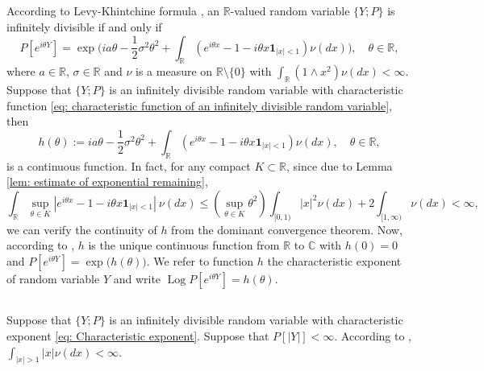 \documentclass[12pt, a4paper]{amsart}
\theoremstyle{definition}
\numberwithin{equation}{section}
\begin{document}
\subsection{}
\label{sec: definition of characteristic exponent}
	According to Levy-Khintchine formula \cite[Theorem 8.1]{Sato1990Levy}, an $\mathbb R$-valued random variable $\{Y; P\}$ is infinitely divisible if and only if
\begin{equation}
\label{eq: characteristic function of an infinitely divisible random variable}
	P[e^{i\theta Y}] 
	= \exp\Big( ia \theta - \frac{1}{2}\sigma^2 \theta^2 + \int_{\mathbb R}(e^{i\theta x} - 1 - i \theta x\mathbf 1_{|x|< 1}) \nu(dx)\Big),
    \quad \theta \in \mathbb R,
\end{equation}
	where $a\in \mathbb R$, $\sigma \in \mathbb R$ and $\nu$ is a measure on $\mathbb R\setminus\{0\}$ with $\int_{\mathbb R}(1\wedge x^2) \nu(dx)< \infty$.
	Suppose that $\{Y;P\}$ is an infinitely divisible random variable with characteristic function \eqref{eq: characteristic function of an infinitely divisible random variable}, then
\begin{equation}
\label{eq: Characteristic exponent}
	h(\theta) 
	:= ia \theta - \frac{1}{2}\sigma^2 \theta^2 + \int_{\mathbb R}(e^{i\theta x} - 1 - i \theta x\mathbf 1_{|x|< 1}) \nu(dx),
	\quad \theta \in \mathbb R, 
\end{equation}
    is a continuous function.
    In fact, for any compact $K \subset \mathbb R$, since due to Lemma \ref{lem: estimate of exponential remaining},
\begin{equation}
\int_{\mathbb R}\sup_{\theta \in K} |e^{i\theta x} - 1 - i \theta x\mathbf 1_{|x|< 1}|~\nu(dx)
\leq (\sup_{\theta \in K} \theta^2)\int_{[0,1)} | x|^2 \nu(dx) + 2 \int_{[1,\infty)} \nu(dx) < \infty,
\end{equation}
    we can verify the continuity of $h$ from the dominant convergence theorem.
    Now, according to \cite[Proposition 1.9.1.]{Linde1986Probability}, 
	$h$ is the unique continuous function from $\mathbb R$ to $\mathbb C$ with $h(0) = 0$ and $P[e^{i\theta Y}] = \exp\big(h(\theta)\big)$.
	We refer to function $h$ the characteristic exponent of random variable $Y$ and write $\operatorname{Log} P[e^{i\theta Y}] = h(\theta)$.

\subsection{}
	
	Suppose that $\{Y;P\}$ is an infinitely divisible random variable with characteristic exponent \eqref{eq: Characteristic exponent}.
	Suppose that $P[|Y|]< \infty$.
	According to \cite[Corollary 25.8.]{Sato1990Levy}, $\int_{|x|>1} |x|\nu(dx) < \infty$.
	
\end{document}
